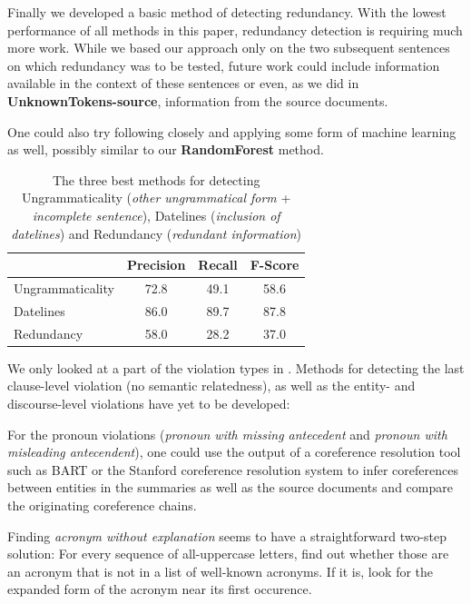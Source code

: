 \documentclass[a4paper,10pt]{scrartcl}
\theoremstyle{style}
\begin{document}
Finally we developed a basic method of detecting redundancy. With the lowest performance of all methods in this paper, redundancy detection is requiring much more work. While we based our approach only on the two subsequent sentences on which redundancy was to be tested, future work could include information available in the context of these sentences or even, as we did in \textbf{UnknownTokens-source}, information from the source documents.

One could also try following \cite{hatzivassiloglou1999detecting} closely and applying some form of machine learning as well, possibly similar to our \textbf{RandomForest} method.

\begin{table}[H]
\begin{center}
\begin{tabular}{|l|c|c|c|}
  \hline
   & Precision & Recall & F-Score\\
  \hline
  Ungrammaticality & 72.8 & 49.1 & 58.6\\
  \hline
  Datelines & 86.0 & 89.7 & 87.8\\
  \hline
  Redundancy & 58.0 & 28.2 & 37.0\\
  \hline
  \end{tabular}
\end{center}
\label{eval_best}
\caption{The three best methods for detecting Ungrammaticality (\textit{other ungrammatical form} + \textit{incomplete sentence}), Datelines (\textit{inclusion of datelines}) and Redundancy (\textit{redundant information})}
\end{table}

We only looked at a part of the violation types in \cite{friedrichlqvsumm}. Methods for detecting the last clause-level violation (no semantic relatedness), as well as the entity- and discourse-level violations have yet to be developed:

For the pronoun violations (\textit{pronoun with missing antecedent} and \textit{pronoun with misleading antecendent}), one could use the output of a coreference resolution tool such as BART \citep{versley2008bart} or the Stanford coreference resolution system \citep{lee2011stanford} to infer coreferences between entities in the summaries as well as the source documents and compare the originating coreference chains.

Finding \textit{acronym without explanation} seems to have a straightforward two-step solution: For every sequence of all-uppercase letters, find out whether those are an acronym that is not in a list of well-known acronyms. If it is, look for the expanded form of the acronym near its first occurence.
\end{document}
